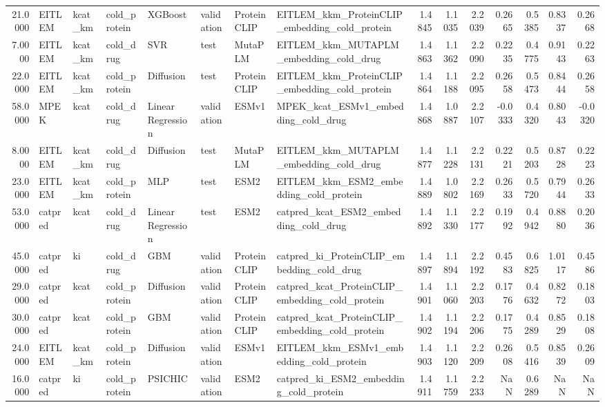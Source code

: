 \begin{tabular}{rlllllllrrrrrrr}
21.0000 & EITLEM & kcat_km & cold_protein & XGBoost & validation & ProteinCLIP & EITLEM_kkm_ProteinCLIP_embedding_cold_protein & 1.4845 & 1.1035 & 2.2039 & 0.2665 & 0.5385 & 0.8337 & 0.2668 \\
7.0000 & EITLEM & kcat_km & cold_drug & SVR & test & MutaPLM & EITLEM_kkm_MUTAPLM_embedding_cold_drug & 1.4863 & 1.1362 & 2.2090 & 0.2235 & 0.4775 & 0.9143 & 0.2263 \\
22.0000 & EITLEM & kcat_km & cold_protein & Diffusion & test & ProteinCLIP & EITLEM_kkm_ProteinCLIP_embedding_cold_protein & 1.4864 & 1.1188 & 2.2095 & 0.2658 & 0.5473 & 0.8444 & 0.2658 \\
58.0000 & MPEK & kcat & cold_drug & Linear Regression & validation & ESMv1 & MPEK_kcat_ESMv1_embedding_cold_drug & 1.4868 & 1.0887 & 2.2107 & -0.0333 & 0.4320 & 0.8043 & -0.0320 \\
8.0000 & EITLEM & kcat_km & cold_drug & Diffusion & test & MutaPLM & EITLEM_kkm_MUTAPLM_embedding_cold_drug & 1.4877 & 1.1228 & 2.2131 & 0.2221 & 0.5203 & 0.8728 & 0.2223 \\
23.0000 & EITLEM & kcat_km & cold_protein & MLP & test & ESM2 & EITLEM_kkm_ESM2_embedding_cold_protein & 1.4889 & 1.0802 & 2.2169 & 0.2633 & 0.5720 & 0.7944 & 0.2633 \\
53.0000 & catpred & kcat & cold_drug & Linear Regression & test & ESM2 & catpred_kcat_ESM2_embedding_cold_drug & 1.4892 & 1.1330 & 2.2177 & 0.1992 & 0.4942 & 0.8880 & 0.2036 \\
45.0000 & catpred & ki & cold_drug & GBM & validation & ProteinCLIP & catpred_ki_ProteinCLIP_embedding_cold_drug & 1.4897 & 1.1894 & 2.2192 & 0.4583 & 0.6825 & 1.0117 & 0.4586 \\
29.0000 & catpred & kcat & cold_protein & Diffusion & validation & ProteinCLIP & catpred_kcat_ProteinCLIP_embedding_cold_protein & 1.4901 & 1.1060 & 2.2203 & 0.1776 & 0.4632 & 0.8272 & 0.1803 \\
30.0000 & catpred & kcat & cold_protein & GBM & validation & ProteinCLIP & catpred_kcat_ProteinCLIP_embedding_cold_protein & 1.4902 & 1.1194 & 2.2206 & 0.1775 & 0.4289 & 0.8529 & 0.1808 \\
24.0000 & EITLEM & kcat_km & cold_protein & Diffusion & validation & ESMv1 & EITLEM_kkm_ESMv1_embedding_cold_protein & 1.4903 & 1.1120 & 2.2209 & 0.2608 & 0.5416 & 0.8539 & 0.2609 \\
16.0000 & catpred & ki & cold_protein & PSICHIC & validation & ESM2 & catpred_ki_ESM2_embedding_cold_protein & 1.4911 & 1.1759 & 2.2233 & NaN & 0.6289 & NaN & NaN \\

\end{tabular}
